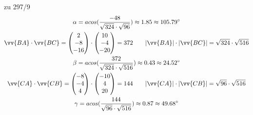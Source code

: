 \begin{exercise}{zu 297/9}
\begin{gather*}
    \alpha = acos(\frac{-48}{\sqrt{324} \cdot \sqrt{96}}) \approx 1.85 \approx 105.79^\circ \\
    \vv{BA} \cdot \vv{BC} = \begin{pmatrix}2 \\ -8 \\ -16\end{pmatrix} \cdot \begin{pmatrix}10 \\ -4 \\ -20\end{pmatrix} = 372 \qquad |\vv{BA}| \cdot |\vv{BC}| = \sqrt{324} \cdot \sqrt{516} \\
    \beta = acos(\frac{372}{\sqrt{324} \cdot \sqrt{516}}) \approx 0.43 \approx 24.52^\circ \\
    \vv{CA} \cdot \vv{CB} = \begin{pmatrix}-8 \\ -4 \\ 4\end{pmatrix} \cdot \begin{pmatrix}-10 \\ 4 \\ 20\end{pmatrix} = 144 \qquad |\vv{CA}| \cdot |\vv{CB}| = \sqrt{96} \cdot \sqrt{516} \\
    \gamma = acos(\frac{144}{\sqrt{96} \cdot \sqrt{516}}) \approx 0.87 \approx 49.68^\circ
  \end{gather*}
\end{exercise}
\newpage
